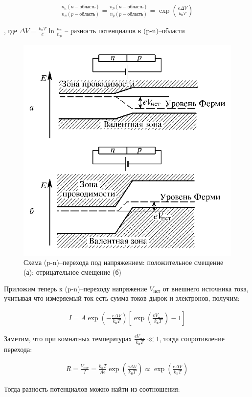 \documentclass[a4paper,12pt]{article}
\begin{document}
\begin{align*}
	\frac{n_n(n-область)}{n_n(p-область)} = \frac{n_p(n-область)}{n_p(p-область)} = \exp\left(\frac{e \Delta V}{k_Б T} \right)
\end{align*}

, где $\Delta V = \frac{k_Б T}{e} \ln \frac{n_n}{n_p}$ -- разность потенциалов в (p-n)--области

\begin{figure}[h!]
	\centering
	\includegraphics[width=0.7\linewidth]{external_voltage}
	\caption{Схема (p-n)--перехода под напряжением: положительное смещение (а); отрицательное смещение (б)}
\end{figure}

Приложим теперь к (p-n)--переходу напряжение $V_{ист}$ от внешнего источника тока, 	учитывая что измеряемый ток есть сумма токов дырок и электронов, получим:

\begin{align*}
	I = A \exp\left(- \frac{e \Delta V}{k_Б T}\right) \left[ \exp \left( \frac{eV_{ист}}{k_Б T}\right) - 1 \right]
\end{align*}

Заметим, что при комнатных температурах $\frac{e V_{ист}}{k_Б T} \ll 1$, тогда сопротивление перехода:

\begin{align*}
	R = \frac{V_{ист}}{I} = \frac{k_Б T}{Ae} \exp\left(\frac{e \Delta V}{k_Б T}\right) \propto \exp\left(\frac{e \Delta V}{k_Б T} \right)
\end{align*}

Тогда разность потенциалов можно найти из соотношения:
\end{document}
